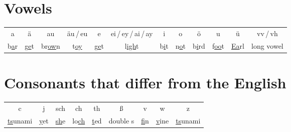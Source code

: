 \section*{Vowels}

\begin{tabular}{cccccccccccc}
a & \"{a} & au & \"{a}u\,/\,eu & e & ei\,/\,ey\,/\,ai\,/\,ay & i & o & \"{o} & u & \"{u} & vv\,/\,vh \\
b\underline{a}r & g\underline{e}t & br\underline{ow}n & t\underline{oy} & g\underline{e}t & l\underline{igh}t &  b\underline{i}t & n\underline{o}t & b\underline{i}rd & f\underline{oo}t & \underline{Ea}rl & long vowel \\
\end{tabular}


\section*{Consonants that differ from the English}

\begin{tabular}{ccccccccc}
c & j & sch & ch & th & \ss & v & w & z \\
\underline{ts}unami & \underline{y}et & \underline{sh}e & lo\underline{ch} & \underline{t}ed & double s & \underline{f}in & \underline{v}ine & \underline{ts}unami \\
\end{tabular}

